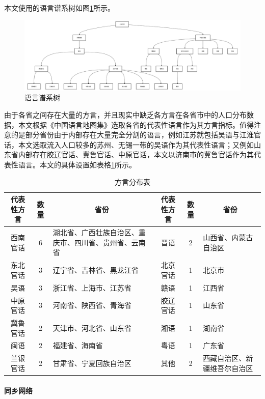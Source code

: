 \documentclass[master, final]{zufe-thesis}
\begin{document}
本文使用的语言谱系树如图\ref{fig:linguistic_tree}所示。
\begin{figure}[!ht]
\centering
\includegraphics[width=\textwidth]{images/linguisitc_tree.drawio.pdf}
\caption{语言谱系树}
\label{fig:linguistic_tree}
\end{figure}
由于各省之间存在大量的方言，并且现实中缺乏各方言在各省市中的人口分布数据，本文根据《中国语言地图集》选取各省的代表性语言作为其方言指标。值得注意的是部分省份由于内部存在大量完全分割的语言，例如江苏就包括吴语与江淮官话，本文选取流入人口较多的苏州、无锡一带的吴语作为其代表性语言；又例如山东省内部存在胶辽官话、冀鲁官话、中原官话，本文以济南市的冀鲁官话作为其代表性语言。本文的具体设置如表格\ref{tab:方言分布表}所示。




\begin{table}[!ht]
\centering
\caption{方言分布表}
\begin{tabularx}{\textwidth}{@{}ccXccX@{}}
\toprule
\textbf{代表性方言} & \textbf{数量} & \multicolumn{1}{c}{\textbf{省份}} & \textbf{代表性方言} &\textbf{数量}  & \multicolumn{1}{c}{\textbf{省份}}\\
\midrule
西南官话 & 6 & 湖北省、广西壮族自治区、重庆市、四川省、贵州省、云南省 &晋语 & 2 &山西省、内蒙古自治区\\
东北官话 & 3 &辽宁省、吉林省、黑龙江省 & 北京官话  &1 &北京市\\
吴语 & 3 &浙江省、上海市、江苏省& 赣语  &1 &江西省\\
中原官话 & 3 &河南省、陕西省、青海省 &胶辽官话  &1& 山东省\\
冀鲁官话 & 2 &天津市、河北省、山东省 &湘语  &1 &湖南省\\
闽语 & 2 &福建省、海南省 &粤语  &1& 广东省\\
兰银官话 & 2 &甘肃省、宁夏回族自治区 &其他  &2& 西藏自治区、新疆维吾尔自治区\\
\bottomrule
\end{tabularx}
\label{tab:方言分布表}
\end{table}



\paragraph{同乡网络}
\end{document}

